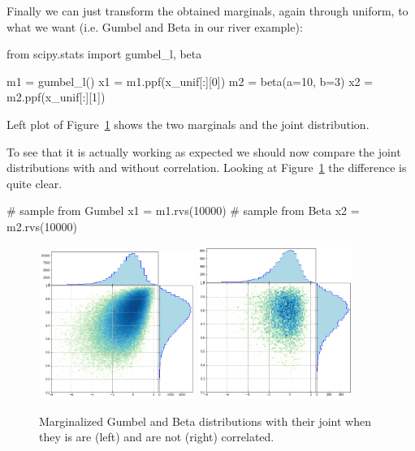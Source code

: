 Finally we can just transform the obtained marginals, again through uniform, to what we want (i.e. Gumbel and Beta in our river example):

\begin{ipython}
from scipy.stats import gumbel_l, beta

m1 = gumbel_l()
x1 = m1.ppf(x_unif[:][0])
m2 = beta(a=10, b=3)
x2 = m2.ppf(x_unif[:][1])
\end{ipython}

Left plot of Figure~\ref{fig:gumbel_beta_with_corr} shows the two marginals and the joint distribution.
    
To see that it is actually working as expected we should now compare the joint distributions with and without correlation. Looking at Figure~\ref{fig:gumbel_beta_with_corr} the difference is quite clear.

\begin{ipython}
# sample from Gumbel
x1 = m1.rvs(10000)
# sample from Beta
x2 = m2.rvs(10000)
\end{ipython}

\begin{figure}[htbp]
  \centering
  \includegraphics[width=0.45\textwidth]{figures/gumbel_vs_beta}
  \quad
  \includegraphics[width=0.45\textwidth]{figures/gumbel_vs_beta_corr}
  \caption{Marginalized Gumbel and Beta distributions with their joint when they is are (left) and are not (right) correlated.}
  \label{fig:gumbel_beta_with_corr}
\end{figure}
    
